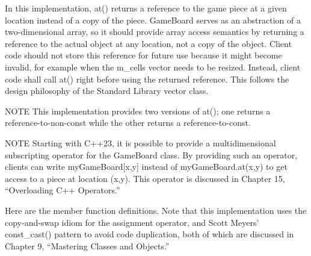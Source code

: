 In this implementation, at() returns a reference to the game piece at a given location instead of a copy of the piece. GameBoard serves as an abstraction of a two-dimensional array, so it should provide array access semantics by returning a reference to the actual object at any location, not a copy of the object. Client code should not store this reference for future use because it might become invalid, for example when the m\_cells vector needs to be resized. Instead, client code shall call at() right before using the returned reference. This follows the design philosophy of the Standard Library vector class.

\begin{myNotic}{NOTE}
This implementation provides two versions of at(); one returns a reference-to-non-const while the other returns a reference-to-const.
\end{myNotic}


\begin{myNotic}{NOTE}
Starting with C++23, it is possible to provide a multidimensional subscripting operator for the GameBoard class. By providing such an operator, clients can write myGameBoard[x,y] instead of myGameBoard.at(x,y) to get access to a piece at location (x,y). This operator is discussed in Chapter 15, “Overloading C++ Operators.”
\end{myNotic}

Here are the member function definitions. Note that this implementation uses the copy-and-swap idiom for the assignment operator, and Scott Meyers’ const\_cast() pattern to avoid code duplication, both of which are discussed in Chapter 9, “Mastering Classes and Objects.”

